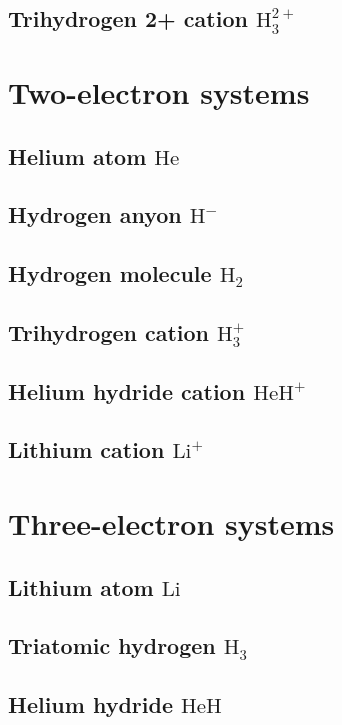 \documentclass{book}
\newcommand{\molecule}[1]{\textrm{#1}}
\begin{document}
\section{Trihydrogen 2+ cation \(\molecule{H}_3^{2+}\)}

\chapter{Two-electron systems} \label{chap:two}
\section{Helium atom \(\molecule{He}\)}
\section{Hydrogen anyon \(\molecule{H}^-\)}
\section{Hydrogen molecule \(\molecule{H}_2\)}
\section{Trihydrogen cation \(\molecule{H}_3^+\)}
\section{Helium hydride cation \(\molecule{HeH}^+\)}
\section{Lithium cation \(\molecule{Li}^+\)}

\chapter{Three-electron systems} \label{chap:three}
\section{Lithium atom \(\molecule{Li}\)}
\section{Triatomic hydrogen \(\molecule{H}_3\)}
\section{Helium hydride \(\molecule{HeH}\)}
\end{document}
